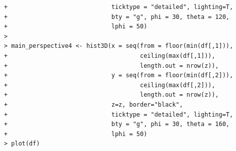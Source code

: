 \documentclass[14pt,a4paper]{scrartcl}
\begin{document}
\begin{verbatim}
+                             ticktype = "detailed", lighting=T, 
+                             bty = "g", phi = 30, theta = 120, 
+                             lphi = 50)
> 
> main_perspective4 <- hist3D(x = seq(from = floor(min(df[,1])), 
+                                     ceiling(max(df[,1])), 
+                                     length.out = nrow(z)),
+                             y = seq(from = floor(min(df[,2])), 
+                                     ceiling(max(df[,2])), 
+                                     length.out = nrow(z)),
+                             z=z, border="black", 
+                             ticktype = "detailed", lighting=T, 
+                             bty = "g", phi = 30, theta = 160, 
+                             lphi = 50)
> plot(df)
\end{verbatim}

\begin{figure}[H]
	\begin{minipage}[h]{1\linewidth}
		  \\
	\end{minipage}
	\hfill
	\begin{minipage}[h]{1\linewidth}
		 \\
	\end{minipage}
\end{figure}
\end{document}

